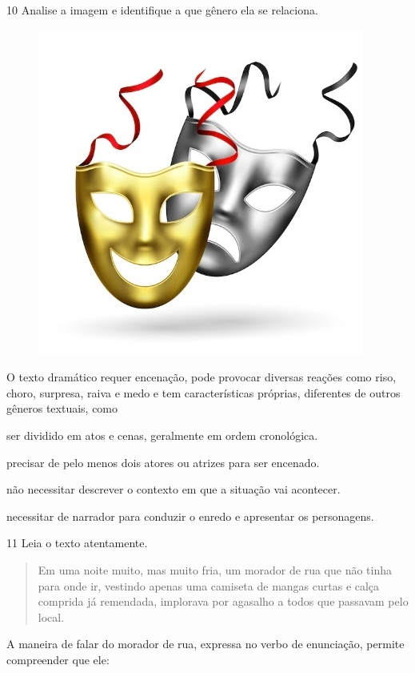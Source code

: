 \num{10} Analise a imagem e identifique a que gênero ela se relaciona.

\begin{figure}[htpb!]
\centering
\includegraphics[width=.5\textwidth]{./media/simulados/image1.jpeg}
\end{figure}

O texto dramático requer encenação, pode provocar diversas reações como
riso, choro, surpresa, raiva e medo e tem características próprias,
diferentes de outros gêneros textuais, como

\begin{escolha}
\item ser dividido em atos e cenas, geralmente em ordem cronológica.

\item precisar de pelo menos dois atores ou atrizes para ser encenado.

\item não necessitar descrever o contexto em que a situação vai acontecer.

\item necessitar de narrador para conduzir o enredo e apresentar os personagens.
\end{escolha}



\num{11} Leia o texto atentamente.

\begin{quote}
Em uma noite muito, mas muito fria, um morador de rua que não tinha para
onde ir, vestindo apenas uma camiseta de mangas curtas e calça comprida
já remendada, implorava por agasalho a todos que passavam pelo local.

\end{quote}

A maneira de falar do morador de rua, expressa no verbo de enunciação,
permite compreender que ele:

